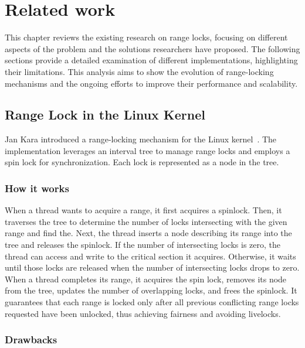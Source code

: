 
\chapter{Related work}\label{chapter:relatedwork}

This chapter reviews the existing research on range locks, focusing on different aspects of the problem and the solutions researchers have proposed. The following sections provide a detailed examination of different implementations, highlighting their limitations. This analysis aims to show the evolution of range-locking mechanisms and the ongoing efforts to improve their performance and scalability.

\section{Range Lock in the Linux Kernel}

Jan Kara introduced a range-locking mechanism for the Linux kernel~\parencite{linuxRangeLockImpl2013}. The implementation leverages an interval tree to manage range locks and employs a spin lock for synchronization. Each lock is represented as a node in the tree.

\subsection*{How it works}

When a thread wants to acquire a range, it first acquires a spinlock. Then, it traverses the tree to determine the number of locks intersecting with the given range and find the. Next, the thread inserts a node describing its range into the tree and releases the spinlock. If the number of intersecting locks is zero, the thread can access and write to the critical section it acquires. Otherwise, it waits until those locks are released when the number of intersecting locks drops to zero. When a thread completes its range, it acquires the spin lock, removes its node from the tree, updates the number of overlapping locks, and frees the spinlock. It guarantees that each range is locked only after all previous conflicting range locks requested have been unlocked, thus achieving fairness and avoiding livelocks.
    
\subsection*{Drawbacks}

